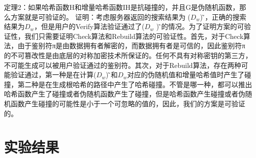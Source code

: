 定理2：如果哈希函数H和增量哈希函数IH是抗碰撞的，并且G是伪随机函数，那么方案就是可验证的。
证明：考虑服务器返回的搜索结果为 ($D_w $) ̃，正确的搜索结果为$D_w$，但是用户的Verify算法验证通过了($D_w$ ) ̃的情况。为了证明方案的可验证性，我们只需要证明Check算法和Rebuild算法的可验证性。首先，对于Check算法，由于鉴别符π是由数据拥有者解密的，而数据拥有者是可信的，因此鉴别符π的不可篡改性是由底层的对称加密技术所保证的。任何不具有对称密钥的第三方，不可能生成可以被用户验证通过的鉴别符。其次，对于Rebuild算法，存在两种可能验证通过，第一种是在计算($D_w $) ̃和$D_w$对应的伪随机值和增量哈希值时产生了碰撞，第二种是在生成根哈希的路径中产生了哈希碰撞。不管是哪一种，都可以推出哈希函数产生了碰撞或者伪随机函数产生了碰撞，但是哈希函数产生碰撞或者伪随机函数产生碰撞的可能性是小于一个可忽略的值的，因此，我们的方案是可验证的。

\section{实验结果}

